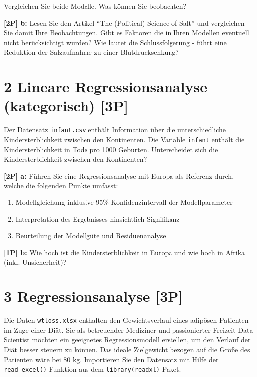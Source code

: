 \documentclass[
]{article}
\providecommand{\tightlist}{%
  \setlength{\itemsep}{0pt}\setlength{\parskip}{0pt}}
\begin{document}
Vergleichen Sie beide Modelle. Was können Sie beobachten?

\textbf{{[}2P{]} b:} Lesen Sie den Artikel ``The (Political) Science of
Salt'' und vergleichen Sie damit Ihre Beobachtungen. Gibt es Faktoren
die in Ihren Modellen eventuell nicht berücksichtigt wurden? Wie lautet
die Schlussfolgerung - führt eine Reduktion der Salzaufnahme zu einer
Blutdrucksenkung?

\hypertarget{lineare-regressionsanalyse-kategorisch-3p}{%
\section{2 Lineare Regressionsanalyse (kategorisch)
{[}3P{]}}\label{lineare-regressionsanalyse-kategorisch-3p}}

Der Datensatz \texttt{infant.csv} enthält Information über die
unterschiedliche Kindersterblichkeit zwischen den Kontinenten. Die
Variable \texttt{infant} enthält die Kindersterblichkeit in Tode pro
1000 Geburten. Unterscheidet sich die Kindersterblichkeit zwischen den
Kontinenten?

\textbf{{[}2P{]} a:} Führen Sie eine Regressionsanalyse mit Europa als
Referenz durch, welche die folgenden Punkte umfasst:

\begin{enumerate}
\def\labelenumi{\roman{enumi})}
\tightlist
\item
  Modellgleichung inklusive 95\% Konfidenzintervall der Modellparameter
\item
  Interpretation des Ergebnisses hinsichtlich Signifikanz
\item
  Beurteilung der Modellgüte und Residuenanalyse
\end{enumerate}

\textbf{{[}1P{]} b:} Wie hoch ist die Kindersterblichkeit in Europa und
wie hoch in Afrika (inkl. Unsicherheit)?

\hypertarget{regressionsanalyse-3p}{%
\section{3 Regressionsanalyse {[}3P{]}}\label{regressionsanalyse-3p}}

Die Daten \texttt{wtloss.xlsx} enthalten den Gewichtsverlauf eines
adipösen Patienten im Zuge einer Diät. Sie als betreuender Mediziner und
passionierter Freizeit Data Scientist möchten ein geeignetes
Regressionsmodell erstellen, um den Verlauf der Diät besser steuern zu
können. Das ideale Zielgewicht bezogen auf die Größe des Patienten wäre
bei 80 kg. Importieren Sie den Datensatz mit Hilfe der
\texttt{read\_excel()} Funktion aus dem \texttt{library(readxl)} Paket.
\end{document}
